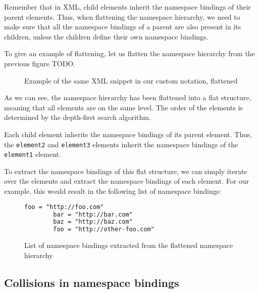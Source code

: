 Remember that in XML, child elements inherit the namespace bindings of their parent elements.
Thus, when flattening the namespace hierarchy, we need to make sure that
all the namespace bindings of a parent are also present in its children, 
unless the children define their own namespace bindings.

To give an example of flattening, let us flatten the namespace hierarchy from the previous figure TODO.

\begin{figure}[H]
    \caption{Example of the same XML snippet in our custom notation, flattened}
    \label{fig:custom_namespace_notation_example_flattened}
\end{figure}

As we can see, the namespace hierarchy has been flattened into a flat structure, meaning that all elements are on the same level.
The order of the elements is determined by the depth-first search algorithm.

Each child element inherits the namespace bindings of its parent element.
Thus, the \texttt{element2} and \texttt{element3} elements inherit the namespace bindings of the \texttt{element1} element.

To extract the namespace bindings of this flat structure, we can simply iterate over the elements and extract the namespace bindings of each element.
For our example, this would result in the following list of namespace bindings:

\begin{figure}
    \caption{List of namespace bindings extracted from the flattened namespace hierarchy}
    \label{fig:custom_namespace_notation_example_flattened_extracted}
    \begin{lstlisting}[language=XML]
        foo = "http://foo.com"
        bar = "http://bar.com"
        baz = "http://baz.com"
        foo = "http://other-foo.com"
    \end{lstlisting}
\end{figure}

\subsection{Collisions in namespace bindings}

